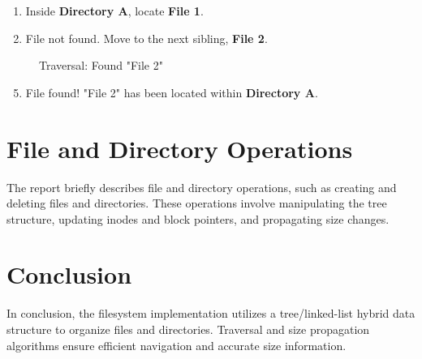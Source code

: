 \documentclass{article}
\begin{document}
\begin{enumerate}
    \item Inside \textbf{Directory A}, locate \textbf{File 1}.
    \item File not found. Move to the next sibling, \textbf{File 2}.
\end{enumerate}

\begin{figure}[H]
    \centering
    \caption{Traversal: Found "File 2"}
\end{figure}

\begin{enumerate}
    \setcounter{enumi}{4}
    \item File found! "File 2" has been located within \textbf{Directory A}.
\end{enumerate}

\section{File and Directory Operations}

The report briefly describes file and directory operations, such as creating and deleting files and directories. These operations involve manipulating the tree structure, updating inodes and block pointers, and propagating size changes.

\section{Conclusion}

In conclusion, the filesystem implementation utilizes a tree/linked-list hybrid data structure to organize files and directories. Traversal and size propagation algorithms ensure efficient navigation and accurate size information.
\end{document}
